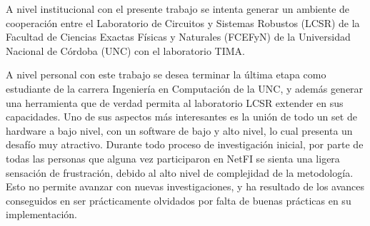 A nivel institucional con el presente trabajo  se intenta generar un ambiente de cooperación entre el Laboratorio de Circuitos y Sistemas Robustos (LCSR) de la Facultad de Ciencias Exactas Físicas y Naturales (FCEFyN) de la  Universidad Nacional de Córdoba (UNC) con el laboratorio TIMA. 

A nivel personal con este trabajo se desea terminar la  última etapa como  estudiante de la carrera Ingeniería en Computación de la UNC, y además generar una herramienta que de verdad permita al laboratorio LCSR extender en sus capacidades. Uno de sus aspectos más interesantes es la unión de todo un set de hardware a bajo nivel, con un software de bajo y alto nivel, lo cual presenta un desafío muy atractivo. Durante todo proceso de investigación inicial, por parte de todas las personas que alguna vez participaron en NetFI se sienta una ligera sensación de frustración, debido al alto nivel de complejidad de la metodología. Esto no permite avanzar con nuevas investigaciones, y ha resultado de los avances conseguidos en ser prácticamente olvidados por falta de buenas prácticas en su implementación. 